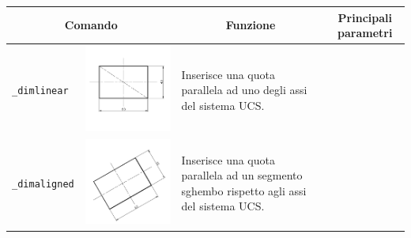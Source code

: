\documentclass[..]{../IEEEphot}
\begin{document}
\begin{center}
\begin{longtable}{m{.2\linewidth}m{.2\linewidth}m{.25\linewidth}m{.25\linewidth}}
\toprule
    \multicolumn{2}{c}{\bfseries Comando} &
    \multicolumn{1}{c}{\bfseries Funzione} &
    \multicolumn{1}{c}{\bfseries Principali parametri} \\
\midrule
\texttt{\_dimlinear} & \includegraphics[width = 0.8\linewidth, keepaspectratio]{../images/jpg/_dimlinear.jpg} & Inserisce una quota parallela ad uno degli assi del sistema UCS. & 
\\
\midrule
\texttt{\_dimaligned} & \includegraphics[width = 0.8\linewidth, keepaspectratio]{../images/jpg/_dimaligned.jpg} & Inserisce una quota parallela ad un segmento sghembo rispetto agli assi del sistema UCS. & 

\end{longtable}
\end{center}
\end{document}

